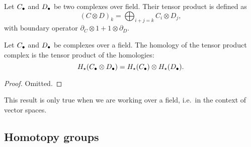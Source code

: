 
\begin{definition}
    Let $C_\bullet$ and  $D_\bullet$ be two complexes over field. Their tensor product is defined as
     \[
         (C \otimes D)_k = \bigoplus_{i+j = k} C_i \otimes D_j
    ,\] 
    with boundary operator $\partial_C \otimes 1 + 1 \otimes\partial_D$.
\end{definition}
\begin{prop}
    Let $C_\bullet$ and  $D_\bullet$ be complexes over a field.
    The homology of the tensor product complex is the tensor product of the homologies:
    \[
        H_\star(C_\bullet \otimes D_\bullet) = H_\star(C_\bullet) \otimes H_\star(D_\bullet)
    .\] 
    \label{prop:hom-tensor-is-tensor-hom}
\end{prop}
\begin{proof}
    Omitted.
\end{proof}
\begin{remark}
    This result is only true when we are working over a field, i.e.\ in the context of vector spaces.
\end{remark}


\subsection*{Homotopy groups}

